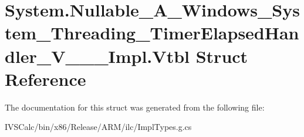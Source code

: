 \hypertarget{struct_system_1_1_nullable___a___windows___system___threading___timer_elapsed_handler___v_______impl_1_1_vtbl}{}\section{System.\+Nullable\+\_\+\+A\+\_\+\+Windows\+\_\+\+System\+\_\+\+Threading\+\_\+\+Timer\+Elapsed\+Handler\+\_\+\+V\+\_\+\+\_\+\+\_\+\+Impl.\+Vtbl Struct Reference}
\label{struct_system_1_1_nullable___a___windows___system___threading___timer_elapsed_handler___v_______impl_1_1_vtbl}


The documentation for this struct was generated from the following file\+:\begin{DoxyCompactItemize}
\item 
I\+V\+S\+Calc/bin/x86/\+Release/\+A\+R\+M/ilc/Impl\+Types.\+g.\+cs\end{DoxyCompactItemize}
